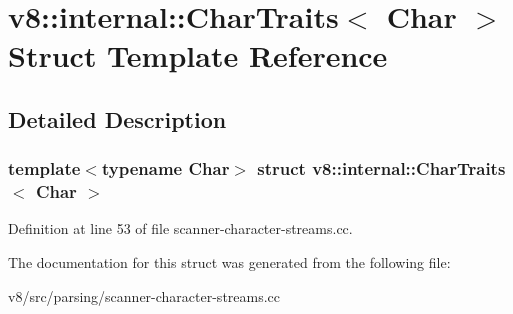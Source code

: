 \hypertarget{structv8_1_1internal_1_1CharTraits}{}\section{v8\+:\+:internal\+:\+:Char\+Traits$<$ Char $>$ Struct Template Reference}
\label{structv8_1_1internal_1_1CharTraits}


\subsection{Detailed Description}
\subsubsection*{template$<$typename Char$>$\newline
struct v8\+::internal\+::\+Char\+Traits$<$ Char $>$}



Definition at line 53 of file scanner-\/character-\/streams.\+cc.



The documentation for this struct was generated from the following file\+:\begin{DoxyCompactItemize}
\item 
v8/src/parsing/scanner-\/character-\/streams.\+cc\end{DoxyCompactItemize}
